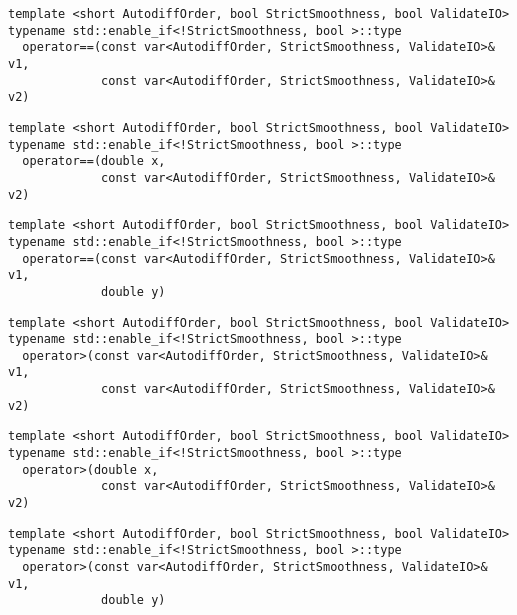 \begin{tcolorbox}[colback=white,colframe=gray90, coltitle=black,boxrule=3pt,
fonttitle=\bfseries,title= Operator Equal To]

\begin{verbatim}
template <short AutodiffOrder, bool StrictSmoothness, bool ValidateIO>
typename std::enable_if<!StrictSmoothness, bool >::type
  operator==(const var<AutodiffOrder, StrictSmoothness, ValidateIO>& v1,
             const var<AutodiffOrder, StrictSmoothness, ValidateIO>& v2)

\end{verbatim}

\begin{verbatim}
template <short AutodiffOrder, bool StrictSmoothness, bool ValidateIO>
typename std::enable_if<!StrictSmoothness, bool >::type
  operator==(double x,
             const var<AutodiffOrder, StrictSmoothness, ValidateIO>& v2)

\end{verbatim}

\begin{verbatim}
template <short AutodiffOrder, bool StrictSmoothness, bool ValidateIO>
typename std::enable_if<!StrictSmoothness, bool >::type
  operator==(const var<AutodiffOrder, StrictSmoothness, ValidateIO>& v1,
             double y)

\end{verbatim}

\end{tcolorbox}

\begin{tcolorbox}[colback=white,colframe=gray90, coltitle=black,boxrule=3pt,
fonttitle=\bfseries,title= Operator Greater Than]

\begin{verbatim}
template <short AutodiffOrder, bool StrictSmoothness, bool ValidateIO>
typename std::enable_if<!StrictSmoothness, bool >::type
  operator>(const var<AutodiffOrder, StrictSmoothness, ValidateIO>& v1,
             const var<AutodiffOrder, StrictSmoothness, ValidateIO>& v2)

\end{verbatim}

\begin{verbatim}
template <short AutodiffOrder, bool StrictSmoothness, bool ValidateIO>
typename std::enable_if<!StrictSmoothness, bool >::type
  operator>(double x,
             const var<AutodiffOrder, StrictSmoothness, ValidateIO>& v2)

\end{verbatim}

\begin{verbatim}
template <short AutodiffOrder, bool StrictSmoothness, bool ValidateIO>
typename std::enable_if<!StrictSmoothness, bool >::type
  operator>(const var<AutodiffOrder, StrictSmoothness, ValidateIO>& v1,
             double y)

\end{verbatim}

\end{tcolorbox}

